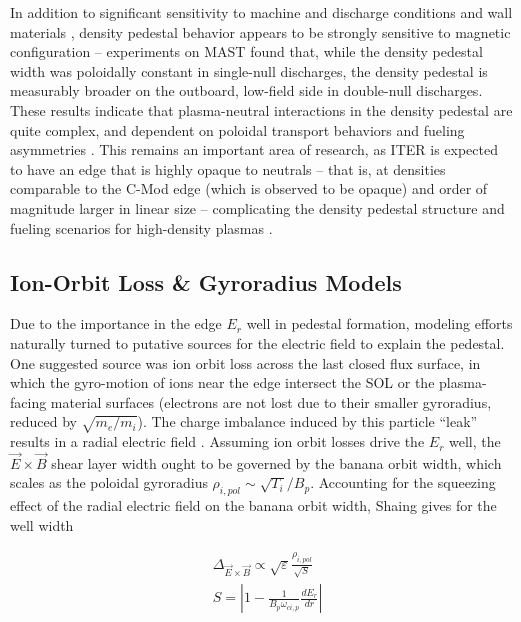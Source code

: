 In addition to significant sensitivity to machine and discharge conditions and wall materials \cite{Beurskens2011}, density pedestal behavior appears to be strongly sensitive to magnetic configuration -- experiments on MAST \cite{Maggi2010} found that, while the density pedestal width was poloidally constant in single-null discharges, the density pedestal is measurably broader on the outboard, low-field side in double-null discharges.  These results indicate that plasma-neutral interactions in the density pedestal are quite complex, and dependent on poloidal transport behaviors and fueling asymmetries \cite{Maggi2010}.  This remains an important area of research, as ITER is expected to have an edge that is highly opaque to neutrals -- that is, at densities comparable to the C-Mod edge (which is observed to be opaque) and order of magnitude larger in linear size -- complicating the density pedestal structure and fueling scenarios for high-density plasmas \cite{Hughes2007,Maggi2010}.

\subsection{Ion-Orbit Loss \& Gyroradius Models}\label{subsec:mod_ionorbitloss}

Due to the importance in the edge $E_r$ well in pedestal formation, modeling efforts naturally turned to putative sources for the electric field to explain the pedestal.  One suggested source was ion orbit loss across the last closed flux surface, in which the gyro-motion of ions near the edge intersect the SOL or the plasma-facing material surfaces (electrons are not lost due to their smaller gyroradius, reduced by $\sqrt{m_e/m_i}$).  The charge imbalance induced by this particle ``leak'' results in a radial electric field \cite{Shaing1990}.  Assuming ion orbit losses drive the $E_r$ well, the $\vec{E}\times\vec{B}$ shear layer width ought to be governed by the banana orbit width, which scales as the poloidal gyroradius $\rho_{i,pol} \sim \sqrt{T_i}/B_p$.  Accounting for the squeezing effect of the radial electric field on the banana orbit width, Shaing \cite{Shaing1992} gives for the well width

\begin{equation}\label{eq:Shaing_width}
 \begin{aligned}
  &\Delta_{\vec{E}\times\vec{B}} \propto \sqrt{\varepsilon} \frac{\rho_{i,pol}}{\sqrt{S}}\\
  &S = \left| 1 - \frac{1}{B_p \omega_{ci,p}} \frac{dE_r}{dr}\right|
 \end{aligned}
\end{equation}

